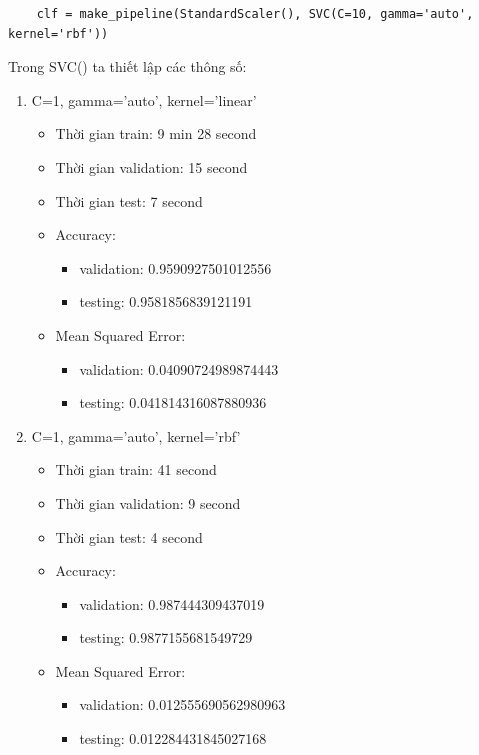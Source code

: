 \documentclass{article}
\begin{document}
\begin{verbatim}
	clf = make_pipeline(StandardScaler(), SVC(C=10, gamma='auto', kernel='rbf'))
\end{verbatim}

Trong SVC() ta thiết lập các thông số:
\begin{enumerate}
	\item C=1, gamma='auto', kernel='linear'
	      \begin{itemize}
		      \item Thời gian train: 9 min 28 second
		      \item Thời gian validation: 15 second
		      \item Thời gian test: 7 second
		      \item Accuracy:
		            \begin{itemize}
			            \item validation: 0.9590927501012556
			            \item testing: 0.9581856839121191
		            \end{itemize}
		      \item Mean Squared Error:
		            \begin{itemize}
			            \item validation: 0.04090724989874443
			            \item testing: 0.041814316087880936
		            \end{itemize}
	      \end{itemize}
	\item C=1, gamma='auto', kernel='rbf'
	      \begin{itemize}
		      \item Thời gian train: 41 second
		      \item Thời gian validation: 9 second
		      \item Thời gian test: 4 second
		      \item Accuracy:
		            \begin{itemize}
			            \item validation: 0.987444309437019
			            \item testing: 0.9877155681549729
		            \end{itemize}
		      \item Mean Squared Error:
		            \begin{itemize}
			            \item validation: 0.012555690562980963
			            \item testing: 0.012284431845027168

\end{itemize}
\end{itemize}
\end{enumerate}
\end{document}
